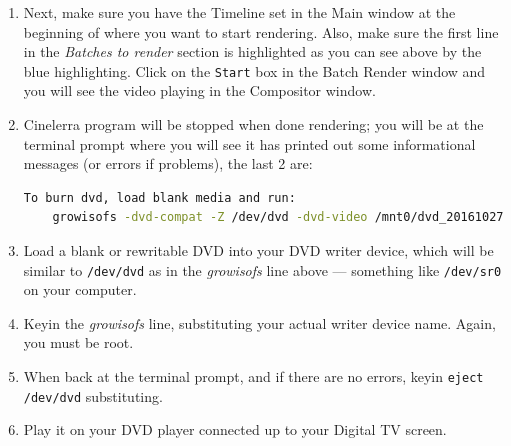 \begin{enumerate}[start=13]
    \item Next, make sure you have the Timeline set in the Main window at the beginning of where you want to start rendering.  Also, make sure the first line in the \textit{Batches to render} section is highlighted as you can see above by the blue highlighting.  Click on the \texttt{Start} box in the Batch Render window and you will see the video playing in the Compositor window.
    \item Cinelerra program will be stopped when done rendering; you will be at the terminal prompt where you will see it has printed out some informational messages (or errors if problems), the last 2 are:
    \begin{lstlisting}[language=bash]
    To burn dvd, load blank media and run:
    growisofs -dvd-compat -Z /dev/dvd -dvd-video /mnt0/dvd_20161027-131723/iso
    \end{lstlisting}
    \item Load a blank or rewritable DVD into your DVD writer device, which will be similar to \texttt{/dev/dvd} as in the \textit{growisofs} line above --- something like \texttt{/dev/sr0} on your computer.
    \item Keyin the \textit{growisofs} line, substituting your actual writer device name.  Again, you must be root.
    \item When back at the terminal prompt, and if there are no errors, keyin \texttt{eject /dev/dvd} substituting.
    \item Play it on your DVD player connected up to your Digital TV screen.
\end{enumerate}



